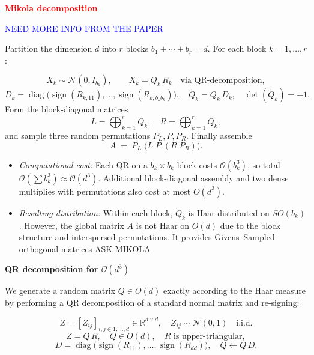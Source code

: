 \documentclass{article}
\theoremstyle{plain}
\theoremstyle{definition}
\theoremstyle{remark}
\begin{document}
\textbf{\textcolor{red}{Mikola decomposition}}

\textcolor{blue}{NEED MORE INFO FROM THE PAPER}

Partition the dimension $d$ into $r$ blocks $b_1+\cdots+b_r = d$.  For each block $k=1,\dots,r$:

\begin{equation*}
  X_k\sim \mathcal{N}(0, I_{b_k}), 
  \qquad
  X_k = Q_k\,R_k
  \quad\text{via QR-decomposition},
\end{equation*}
\begin{equation*}
  D_k = \operatorname{diag}\bigl(\operatorname{sign}(R_{k,11}),\dots,\operatorname{sign}(R_{k,b_k b_k})\bigr),
  \quad
  \widetilde Q_k = Q_k\,D_k,\quad \det(\widetilde Q_k)=+1.
\end{equation*}
Form the block-diagonal matrices
\begin{equation*}
  L = \bigoplus_{k=1}^r \widetilde Q_k,
  \quad
  R = \bigoplus_{k=1}^r \widetilde Q_k,
\end{equation*}
and sample three random permutations $P_L,P,P_R$.  Finally assemble
\begin{equation*}
  A \;=\; P_L \;\bigl(L\;P\;(R\;P_R)\bigr).
\end{equation*}

\begin{itemize}
  \item \emph{Computational cost:}  
    Each QR on a $b_k\times b_k$ block costs $\mathcal{O}(b_k^3)$, so total $\mathcal{O}(\sum b_k^3)\approx \mathcal{O}(d^3)$.  
    Additional block-diagonal assembly and two dense multiplies with permutations also cost at most $O(d^3)$.
  \item \emph{Resulting distribution:}  
    Within each block, $\widetilde Q_k$ is Haar-distributed on $SO(b_k)$. However, the global matrix $A$ is not Haar on $O(d)$ due to the block structure and interspersed permutations.  
    It provides Givens–Sampled orthogonal matrices ASK MIKOLA
\end{itemize}

\textbf{QR decomposition for $\mathcal{O}(d^3)$}

We generate a random matrix $Q\in O(d)$ exactly according to the Haar measure by performing a QR decomposition of a standard normal matrix and re-signing:

\begin{equation*}
  Z = [Z_{ij}]_{i,j \in \overline{1, \dots, d}}\in\mathbb R^{d\times d},\quad Z_{ij}\sim\mathcal N(0,1)\quad\text{i.i.d.}
\end{equation*}
\begin{equation*}
  Z = Q\,R,\quad Q\in O(d),\quad R\text{ is upper-triangular},
\end{equation*}
\begin{equation*}
  D = \operatorname{diag}\bigl(\operatorname{sign}(R_{11}),\dots,\operatorname{sign}(R_{dd})\bigr),\quad
  Q \leftarrow Q\,D.
\end{equation*}
\end{document}
